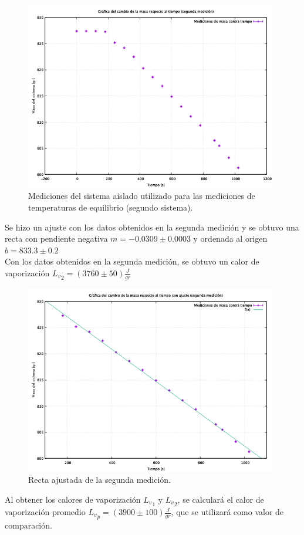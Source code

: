\documentclass[a4paper]{article}
\begin{document}
\begin{figure}[H]
    \centering
    \includegraphics[width=11cm]{segundamed.png}
    \caption{Mediciones del sistema aislado utilizado para las mediciones de temperaturas de equilibrio (segundo sistema).}
\end{figure}

Se hizo un ajuste con los datos obtenidos en la segunda medición y se obtuvo una recta con pendiente negativa $m=-0.0309\pm0.0003$ y ordenada al origen $b=833.3\pm0.2$\\
Con los datos obtenidos en la segunda medición, se obtuvo un calor de vaporización ${{L}_v}_2=(3760\pm50)\frac{J}{gr}$
\begin{figure}[H]
    \centering
    \includegraphics[width=11cm]{segundaajuste.png}
    \caption{Recta ajustada de la segunda medición.}
\end{figure}
Al obtener los calores de vaporización ${{L}_v}_1$ y ${{L}_v}_2$, se calculará el calor de vaporización promedio ${{L}_v}_p=(3900\pm100)\frac{J}{gr}$, que se utilizará como valor de comparación. 
\end{document}
